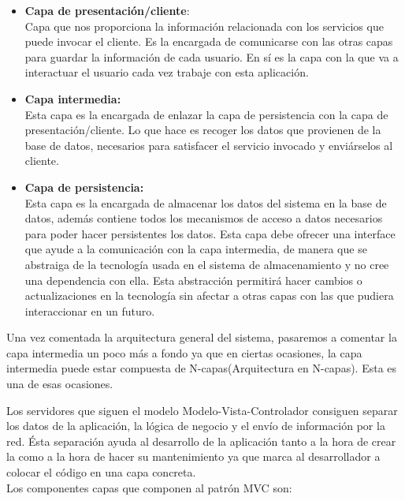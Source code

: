 \begin{itemize}
\item \textbf{Capa de presentación/cliente}:\\
Capa que nos proporciona la información relacionada con los servicios que puede invocar el cliente. Es la encargada de comunicarse con las otras capas para guardar la información de cada usuario. En sí es la capa con la que va a interactuar el usuario cada vez trabaje con esta aplicación.

\item \textbf{Capa intermedia:}\\
Esta capa es la encargada de enlazar la capa de persistencia con la capa de presentación/cliente. Lo que hace es recoger los datos que provienen de la base de datos, necesarios para satisfacer el servicio invocado y enviárselos al cliente.

\item \textbf{Capa de persistencia:}\\
Esta capa es la encargada de almacenar los datos del sistema en la base de datos, además contiene todos los mecanismos de acceso a datos necesarios para poder hacer persistentes los datos.
 Esta capa debe ofrecer una interface que ayude a la comunicación con la capa intermedia, de manera que se abstraiga de la tecnología usada en el sistema de almacenamiento y no cree una dependencia con ella. Esta abstracción permitirá hacer cambios o actualizaciones en la tecnología sin afectar a otras capas con las que pudiera interaccionar en un futuro.\\
 


\end{itemize}
Una vez comentada la arquitectura general del sistema, pasaremos a comentar la capa intermedia un poco más a fondo ya que en ciertas ocasiones, la capa intermedia puede estar compuesta de N-capas(Arquitectura en N-capas). Esta es una de esas ocasiones.

Los servidores que siguen el modelo Modelo-Vista-Controlador consiguen separar los datos de la  aplicación, la lógica de negocio  y el envío  de información por la red.
Ésta separación ayuda al desarrollo de la aplicación tanto a la hora de crear la como a la hora de hacer su mantenimiento ya que marca al desarrollador a colocar el código en una capa concreta. \\


Los componentes capas que componen al patrón MVC son:

